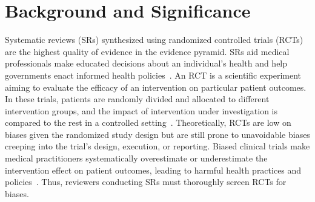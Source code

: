 \documentclass[sn-mathphys,Numbered]{sn-jnl}%
\theoremstyle{thmstyleone}%
\theoremstyle{thmstyletwo}%
\theoremstyle{thmstylethree}%
\begin{document}



\maketitle


\section{Background and Significance}
\label{sec:background}
%
Systematic reviews (SRs) synthesized using randomized controlled trials (RCTs) are the highest quality of evidence in the evidence pyramid.
SRs aid medical professionals make educated decisions about an individual's health and help governments enact informed health policies~\cite{mogo2022systematic,mctigue2006obesity}.
An RCT is a scientific experiment aiming to evaluate the efficacy of an intervention on particular patient outcomes.
In these trials, patients are randomly divided and allocated to different intervention groups, and the impact of intervention under investigation is compared to the rest in a controlled setting~\cite{sibbald1998understanding}.
Theoretically, RCTs are low on biases given the randomized study design but are still prone to unavoidable biases creeping into the trial's design, execution, or reporting.
Biased clinical trials make medical practitioners systematically overestimate or underestimate the intervention effect on patient outcomes, leading to harmful health practices and policies~\cite{kjaergard1999randomized,naci2019design}.
Thus, reviewers conducting SRs must thoroughly screen RCTs for biases.
\end{document}
